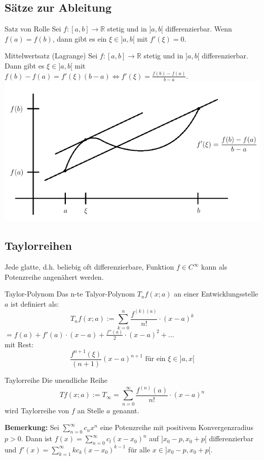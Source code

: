 \documentclass[a4paper,8pt]{extarticle}
\newenvironment{bemerkung}{
   \noindent \textbf{Bemerkung:  }}{}
\def\sumk{\sum_{k=1}^\infty}
\def\sumn{\sum_{n=0}^\infty}
\def\R{\mathbb{R}}
\begin{document}
\subsection{Sätze zur Ableitung}
\begin{subbox}{Satz von Rolle}
 Sei $f: [a,b] \to \R$ stetig und in $]a,b[$ differenzierbar. Wenn $f(a) = f(b)$, dann gibt es ein $\xi \in ]a,b[$ mit $f'(\xi) = 0$.
\end{subbox}
\begin{mainbox}{Mittelwertsatz (Lagrange)}
 Sei $f: [a,b] \to \R$ stetig und in $]a,b[$ differenzierbar. Dann gibt es $\xi \in ]a,b[$ mit $f(b) - f(a) = f'(\xi)(b-a) \Leftrightarrow f'(\xi) = \frac{f(b) - f(a)}{b-a}$.
 \includegraphics[width=\linewidth]{mittelwertsatz.png}
\end{mainbox}


\subsection{Taylorreihen}
Jede glatte, d.h. beliebig oft differenzierbare, Funktion $f \in C^\infty$ kann als Potenzreihe angenähert werden.

\begin{mainbox}{Taylor-Polynom}
 Das n-te Talyor-Polynom $T_n f(x; a)$ an einer Entwicklungsstelle $a$ ist definiert als:
 $$T_n f(x; a) := \sum_{k=0}^{n} \frac{f^{(k) (a)}}{n!} \cdot (x - a)^k$$ 
 $ = f(a) + f'(a) \cdot (x-a) + \frac{f''(a)}{2} \cdot (x - a)^2 + \ldots$ \\
 mit Rest: $$\frac{f^{n+1}(\xi)}{(n + 1)}(x - a)^{n + 1} \text{ für ein } \xi \in ] a, x [$$ 
\end{mainbox}

\begin{mainbox}{Taylorreihe}
 Die unendliche Reihe
 $$Tf(x;a) := T_\infty = \sumn \frac{f^{(n)}(a)}{n!} \cdot (x-a)^n$$
 wird Taylorreihe von $f$ an Stelle $a$ genannt.
\end{mainbox}
\begin{bemerkung}
  Sei $\sumn c_n x^n$ eine Potenzreihe mit positivem Konvergenzradius $p > 0$. Dann ist $f(x) = \sumn c_l(x - x_0)^n$ auf $]x_0 - p, x_0 + p[$ differenzierbar und $f'(x) = \sumk kc_k(x-x_0)^{k-1}$ für alle $x \in ]x_0 - p, x_0 + p[$.
\end{bemerkung}
\end{document}
